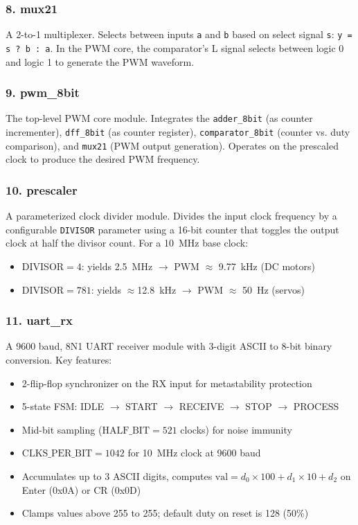 \documentclass[12pt,a4paper]{article}
\begin{document}
\subsubsection*{8. mux21}
A 2-to-1 multiplexer. Selects between inputs \texttt{a} and \texttt{b} based on select signal \texttt{s}: \texttt{y = s ? b : a}. In the PWM core, the comparator's L signal selects between logic 0 and logic 1 to generate the PWM waveform.

\subsubsection*{9. pwm\_8bit}
The top-level PWM core module. Integrates the \texttt{adder\_8bit} (as counter incrementer), \texttt{dff\_8bit} (as counter register), \texttt{comparator\_8bit} (counter vs. duty comparison), and \texttt{mux21} (PWM output generation). Operates on the prescaled clock to produce the desired PWM frequency.

\subsubsection*{10. prescaler}
A parameterized clock divider module. Divides the input clock frequency by a configurable \texttt{DIVISOR} parameter using a 16-bit counter that toggles the output clock at half the divisor count. For a 10~MHz base clock:
\begin{itemize}
\item DIVISOR${}=4$: yields 2.5~MHz $\rightarrow$ PWM $\approx$ 9.77~kHz (DC motors)
\item DIVISOR${}=781$: yields $\approx$12.8~kHz $\rightarrow$ PWM $\approx$ 50~Hz (servos)
\end{itemize}

\subsubsection*{11. uart\_rx}
A 9600 baud, 8N1 UART receiver module with 3-digit ASCII to 8-bit binary conversion. Key features:
\begin{itemize}
\item 2-flip-flop synchronizer on the RX input for metastability protection
\item 5-state FSM: IDLE $\rightarrow$ START $\rightarrow$ RECEIVE $\rightarrow$ STOP $\rightarrow$ PROCESS
\item Mid-bit sampling ($\text{HALF\_BIT} = 521$ clocks) for noise immunity
\item $\text{CLKS\_PER\_BIT} = 1042$ for 10~MHz clock at 9600 baud
\item Accumulates up to 3 ASCII digits, computes $\text{val} = d_0 \times 100 + d_1 \times 10 + d_2$ on Enter (0x0A) or CR (0x0D)
\item Clamps values above 255 to 255; default duty on reset is 128 (50\%)
\end{itemize}
\end{document}
